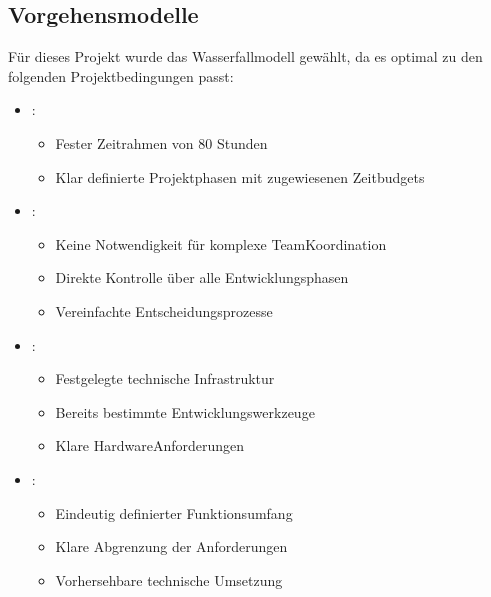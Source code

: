 \documentclass[a4paper,12pt,ngerman]{sphinxmanual}
\begin{document}
\subsection{Vorgehensmodelle}
\label{\detokenize{sections/projektplanung_analyse:vorgehensmodelle}}
\sphinxAtStartPar
Für dieses Projekt wurde das Wasserfallmodell gewählt, da es optimal zu den folgenden Projektbedingungen passt:
\begin{itemize}
\item {} 
\sphinxAtStartPar
{}:
\begin{itemize}
\item {} 
\sphinxAtStartPar
Fester Zeitrahmen von 80 Stunden

\item {} 
\sphinxAtStartPar
Klar definierte Projektphasen mit zugewiesenen Zeitbudgets

\end{itemize}

\item {} 
\sphinxAtStartPar
{}:
\begin{itemize}
\item {} 
\sphinxAtStartPar
Keine Notwendigkeit für komplexe Team\sphinxhyphen{}Koordination

\item {} 
\sphinxAtStartPar
Direkte Kontrolle über alle Entwicklungsphasen

\item {} 
\sphinxAtStartPar
Vereinfachte Entscheidungsprozesse

\end{itemize}

\item {} 
\sphinxAtStartPar
{}:
\begin{itemize}
\item {} 
\sphinxAtStartPar
Festgelegte technische Infrastruktur

\item {} 
\sphinxAtStartPar
Bereits bestimmte Entwicklungswerkzeuge

\item {} 
\sphinxAtStartPar
Klare Hardware\sphinxhyphen{}Anforderungen

\end{itemize}

\item {} 
\sphinxAtStartPar
{}:
\begin{itemize}
\item {} 
\sphinxAtStartPar
Eindeutig definierter Funktionsumfang

\item {} 
\sphinxAtStartPar
Klare Abgrenzung der Anforderungen

\item {} 
\sphinxAtStartPar
Vorhersehbare technische Umsetzung

\end{itemize}

\end{itemize}
\end{document}

